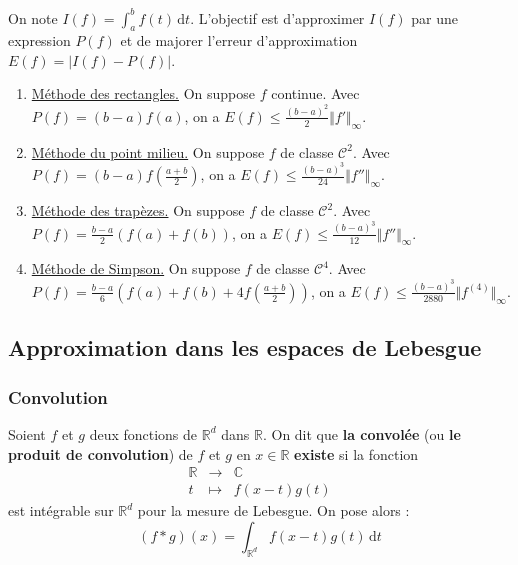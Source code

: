 
  \begin{application}
    On note $I(f) = \int_a^b f(t) \, \mathrm{d}t$. L'objectif est d'approximer $I(f)$ par une expression $P(f)$ et de majorer l'erreur d'approximation $E(f) = \vert I(f) - P(f) \vert$.
    \begin{enumerate}[label={\bfseries(\roman*)}]
      \item \uline{Méthode des rectangles.} On suppose $f$ continue. Avec $P(f) = (b-a)f(a)$, on a $E(f) \leq \frac{(b-a)^2}{2} \Vert f' \Vert_\infty$.
      \item \uline{Méthode du point milieu.} On suppose $f$ de classe $\mathcal{C}^2$. Avec $P(f) = (b-a)f \left( \frac{a+b}{2} \right)$, on a $E(f) \leq \frac{(b-a)^3}{24} \Vert f'' \Vert_\infty$.
      \item \uline{Méthode des trapèzes.} On suppose $f$ de classe $\mathcal{C}^2$. Avec $P(f) = \frac{b-a}{2} (f(a) + f(b))$, on a $E(f) \leq \frac{(b-a)^3}{12} \Vert f'' \Vert_\infty$.
      \item \uline{Méthode de Simpson.} On suppose $f$ de classe $\mathcal{C}^4$. Avec $P(f) = \frac{b-a}{6} \left(f(a) + f(b) + 4f \left( \frac{a+b}{2} \right)\right)$, on a $E(f) \leq \frac{(b-a)^3}{2880} \Vert f^{(4)} \Vert_\infty$.
    \end{enumerate}
  \end{application}

  \subsection{Approximation dans les espaces de Lebesgue}

  \subsubsection{Convolution}


  \begin{definition}
    Soient $f$ et $g$ deux fonctions de $\mathbb{R}^d$ dans $\mathbb{R}$. On dit que \textbf{la convolée} (ou \textbf{le produit de convolution}) de $f$ et $g$ en $x \in \mathbb{R}$ \textbf{existe} si la fonction
    \[
    \begin{array}{ccc}
      \mathbb{R} &\rightarrow& \mathbb{C} \\
      t &\mapsto& f(x-t)g(t)
    \end{array}
    \]
    est intégrable sur $\mathbb{R}^d$ pour la mesure de Lebesgue. On pose alors :
    \[ (f * g)(x) = \int_{\mathbb{R}^d} f(x-t)g(t) \, \mathrm{d}t \]
  \end{definition}

